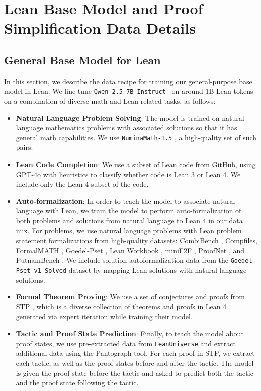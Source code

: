 \newpage
\section{Lean Base Model and Proof Simplification Data Details} \label{appendix:base-model-and-data}

\subsection{General Base Model for Lean} \label{subsec:lean-base-model}

In this section, we describe the data recipe for training our general-purpose base model in Lean. We fine-tune \texttt{Qwen-2.5-7B-Instruct}~\citep{qwen2} on around 1B Lean tokens on a combination of diverse math and Lean-related tasks, as follows:
\begin{itemize}
    \item \textbf{Natural Language Problem Solving}: The model is trained on natural language mathematics problems with associated solutions so that it has general math capabilities. We use \texttt{NuminaMath-1.5} \citep{numina_math_datasets}, a high-quality set of such pairs.
    \item \textbf{Lean Code Completion}: We use a subset of Lean code from GitHub, using GPT-4o with heuristics to classify whether code is Lean 3 or Lean 4. We include only the Lean 4 subset of the code.
    \item \textbf{Auto-formalization}: In order to teach the model to associate natural language with Lean, we train the model to perform auto-formalization of both problems and solutions from natural language to Lean 4 in our data mix. For problems, we use natural language problems with Lean problem statement formalizations from high-quality datasets: CombiBench \citep{liu2025combibench}, Compfiles, FormalMATH \citep{yu2025formalmath}, Goedel-Pset \citep{lin2025goedel}, Lean Workbook \citep{ying2024lean}, miniF2F \citep{zheng2021minif2f}, ProofNet \citep{azerbayev2023proofnet}, and PutnamBench \citep{tsoukalas2024putnambench}. We include solution autoformalization data from the \texttt{Goedel-Pset-v1-Solved} dataset by mapping Lean solutions with natural language solutions.
    \item \textbf{Formal Theorem Proving}: We use a set of conjectures and proofs from STP \citep{dong2025stp}, which is a diverse collection of theorems and proofs in Lean 4 generated via expert iteration while training their model.
    \item \textbf{Tactic and Proof State Prediction}: Finally, to teach the model about proof states, we use pre-extracted data from \texttt{LeanUniverse} \citep{ahm2025leanuniverse} and extract additional data using the Pantograph \citep{aniva2025pantograph} tool. For each proof in STP, we extract each tactic, as well as the proof states before and after the tactic. The model is given the proof state before the tactic and asked to predict both the tactic and the proof state following the tactic.
\end{itemize}

